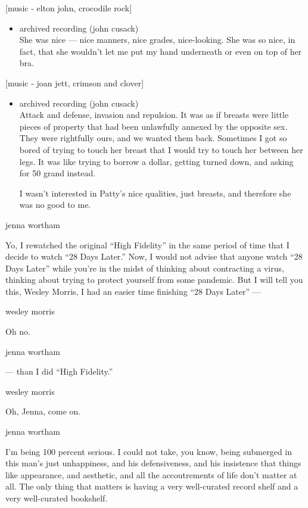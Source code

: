 {[}music - elton john, crocodile rock{]}

\begin{itemize}
\tightlist
\item
  archived recording (john cusack)\\
  She was nice --- nice manners, nice grades, nice-looking. She was so
  nice, in fact, that she wouldn't let me put my hand underneath or even
  on top of her bra.
\end{itemize}

{[}music - joan jett, crimson and clover{]}

\begin{itemize}
\item
  archived recording (john cusack)\\
  Attack and defense, invasion and repulsion. It was as if breasts were
  little pieces of property that had been unlawfully annexed by the
  opposite sex. They were rightfully ours, and we wanted them back.
  Sometimes I got so bored of trying to touch her breast that I would
  try to touch her between her legs. It was like trying to borrow a
  dollar, getting turned down, and asking for 50 grand instead.

  I wasn't interested in Patty's nice qualities, just breasts, and
  therefore she was no good to me.
\end{itemize}

jenna wortham

Yo, I rewatched the original ``High Fidelity'' in the same period of
time that I decide to watch ``28 Days Later.'' Now, I would not advise
that anyone watch ``28 Days Later'' while you're in the midst of
thinking about contracting a virus, thinking about trying to protect
yourself from some pandemic. But I will tell you this, Wesley Morris, I
had an easier time finishing ``28 Days Later'' ---

wesley morris

Oh no.

jenna wortham

--- than I did ``High Fidelity.''

wesley morris

Oh, Jenna, come on.

jenna wortham

I'm being 100 percent serious. I could not take, you know, being
submerged in this man's just unhappiness, and his defensiveness, and his
insistence that things like appearance, and aesthetic, and all the
accoutrements of life don't matter at all. The only thing that matters
is having a very well-curated record shelf and a very well-curated
bookshelf.


